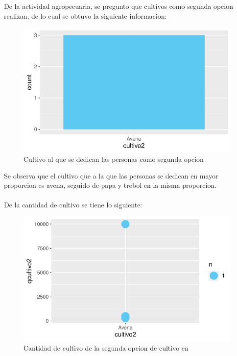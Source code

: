 \documentclass[12pt]{article}\usepackage[]{graphicx}\usepackage[]{xcolor}
\makeatletter
\def\maxwidth{ %
  \ifdim\Gin@nat@width>\linewidth
    \linewidth
  \else
    \Gin@nat@width
  \fi
}
\newenvironment{knitrout}{}{} %
\makeatother
\begin{document}
	De la actividad agropecuaria, se pregunto que cultivos como segunda opcion realizan, de lo cual se obtuvo la siguiente informacion:
	\begin{figure}[H]
	\centering
\begin{knitrout}
\color{fgcolor}
\includegraphics[width=\maxwidth]{figure/nine-1} 
\end{knitrout}
	\caption{Cultivo al que se dedican las personas como segunda opcion}
	\end{figure}
	Se observa que el cultivo que a la que las personas se dedican en mayor proporcion es avena, seguido de papa y trebol en la misma proporcion.\\
	\\
	De la cantidad de cultivo se tiene lo siguiente:
	\begin{figure}[H]
	\centering
\begin{knitrout}
\color{fgcolor}
\includegraphics[width=\maxwidth]{figure/ten-1} 
\end{knitrout}
	\caption{Cantidad de cultivo de la segunda opcion de cultivo en \comunidad}
	\end{figure}
\end{document}
